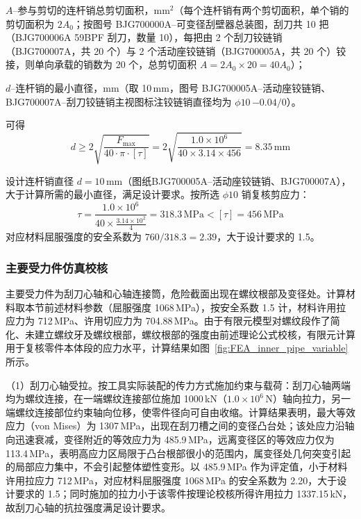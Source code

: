 $A$--参与剪切的连杆销总剪切面积，mm$^2$（每个连杆销有两个剪切面积，单个销的剪切面积为 $2A_0$；按图号 BJG700000A--可变径刮壁器总装图，刮刀共 10 把（BJG700006A 59BPF 刮刀，数量 10），每把由 2 个刮刀铰链销（BJG700007A，共 20 个）与 2 个活动座铰链销（BJG700005A，共 20 个）铰接，则单向承载的销数为 20 个，总剪切面积 $A = 2A_0 \times 20 = 40A_0$）；

$d$--连杆销的最小直径，mm（取 10\,mm，图号 BJG700005A--活动座铰链销、BJG700007A--刮刀铰链销主视图标注铰链销直径均为 $\phi 10\,{-0.04}/0$）。

可得
\begin{equation}
    d \ge 2\sqrt{\frac{F_{\max}}{40 \cdot \pi \cdot [\tau]}} = 2\sqrt{\frac{1.0 \times 10^{6}}{40 \times 3.14 \times 456}} = 8.35\,\mathrm{mm}
\end{equation}

设计连杆销直径 $d = 10\,\mathrm{mm}$（图纸BJG700005A--活动座铰链销、BJG700007A），大于计算所需的最小直径，满足设计要求。按所选 $\phi 10$ 销复核剪应力：
\begin{equation}
    \tau = \frac{1.0 \times 10^{6}}{40 \times \frac{3.14 \times 10^{2}}{4}} = 318.3\,\mathrm{MPa} < [\tau] = 456\,\mathrm{MPa}
\end{equation}
对应材料屈服强度的安全系数为 $760/318.3 = 2.39$，大于设计要求的 1.5。


\subsubsection{主要受力件仿真校核}

主要受力件为刮刀心轴和心轴连接筒，危险截面出现在螺纹根部及变径处。计算材料取本节前述材料参数（屈服强度 1068\,MPa），按安全系数 1.5 计，材料许用拉应力为 712\,MPa、许用切应力为 704.88\,MPa。由于有限元模型对螺纹段作了简化、未建立螺纹牙及螺纹根部，螺纹根部的强度由前述理论公式校核，有限元计算用于复核零件本体段的应力水平，计算结果如图~\ref{fig:FEA_inner_pipe_variable}所示。

（1）刮刀心轴受拉。按工具实际装配的传力方式施加约束与载荷：刮刀心轴两端均为螺纹连接，在一端螺纹连接部位施加 1000\,kN（\(1.0\times10^{6}\)\,N）轴向拉力，另一端螺纹连接部位约束轴向位移，使零件径向可自由收缩。计算结果表明，最大等效应力（von Mises）为 1307\,MPa，出现在刮刀槽之间的变径凸台处；该处应力沿轴向迅速衰减，变径附近的等效应力为 485.9\,MPa，远离变径区的等效应力仅为 113.4\,MPa，表明高应力区局限于凸台根部很小的范围内，属变径处几何突变引起的局部应力集中，不会引起整体塑性变形。以 485.9\,MPa 作为评定值，小于材料许用拉应力 712\,MPa，对应材料屈服强度 1068\,MPa 的安全系数为 2.20，大于设计要求的 1.5；同时施加的拉力小于该零件按理论校核所得许用拉力 1337.15\,kN，故刮刀心轴的抗拉强度满足设计要求。


